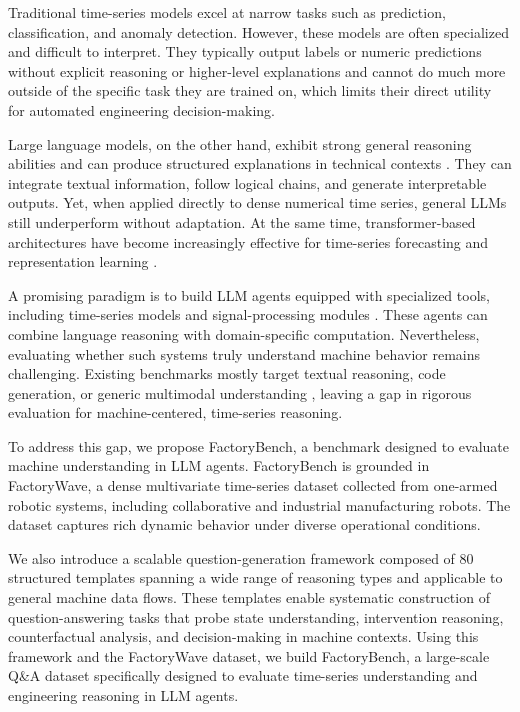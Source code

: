 \documentclass{article}
\begin{document}
Traditional time-series models excel at narrow tasks such as prediction, classification, and anomaly detection. However, these models are often specialized and difficult to interpret. They typically output labels or numeric predictions without explicit reasoning or higher-level explanations and cannot do much more outside of the specific task they are trained on, which limits their direct utility for automated engineering decision-making.

Large language models, on the other hand, exhibit strong general reasoning abilities and can produce structured explanations in technical contexts \cite{wei2022chain,yao2023tree}. They can integrate textual information, follow logical chains, and generate interpretable outputs. Yet, when applied directly to dense numerical time series, general LLMs still underperform without adaptation. At the same time, transformer-based architectures have become increasingly effective for time-series forecasting and representation learning \cite{vaswani2017attention,zhou2021informer,wu2021autoformer,zhou2022fedformer,nie2023patchtst,woo2024chronos,das2024survey}.

A promising paradigm is to build LLM agents equipped with specialized tools, including time-series models and signal-processing modules \cite{schick2023toolformer,yao2023react,qin2023tool}. These agents can combine language reasoning with domain-specific computation. Nevertheless, evaluating whether such systems truly understand machine behavior remains challenging. Existing benchmarks mostly target textual reasoning, code generation, or generic multimodal understanding \cite{hendrycks2021mmlu,srivastava2023bigbench,yue2024mmmu}, leaving a gap in rigorous evaluation for machine-centered, time-series reasoning.

To address this gap, we propose FactoryBench, a benchmark designed to evaluate machine understanding in LLM agents. FactoryBench is grounded in FactoryWave, a dense multivariate time-series dataset collected from one-armed robotic systems, including collaborative and industrial manufacturing robots. The dataset captures rich dynamic behavior under diverse operational conditions.

We also introduce a scalable question-generation framework composed of 80 structured templates spanning a wide range of reasoning types and applicable to general machine data flows. These templates enable systematic construction of question-answering tasks that probe state understanding, intervention reasoning, counterfactual analysis, and decision-making in machine contexts. Using this framework and the FactoryWave dataset, we build FactoryBench, a large-scale Q\&A dataset specifically designed to evaluate time-series understanding and engineering reasoning in LLM agents.
\end{document}
